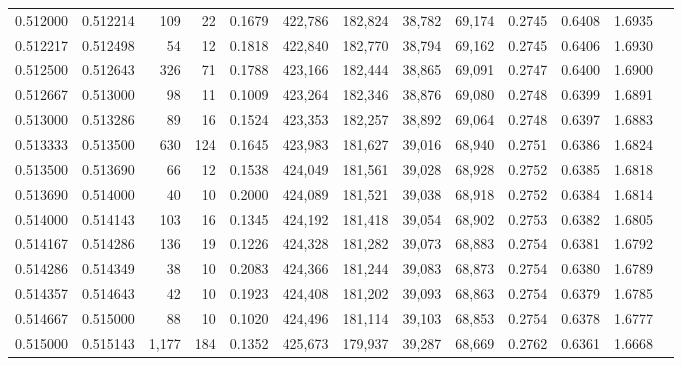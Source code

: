 \begin{tabular}{rrrrrrrrrrrrr}
0.512000 & 0.512214 &   109 &  22 &                                     0.1679 & 422,786 & 182,824 &  38,782 &  69,174 & 0.2745 & 0.6408 & 1.6935 \\
0.512217 & 0.512498 &    54 &  12 &                                     0.1818 & 422,840 & 182,770 &  38,794 &  69,162 & 0.2745 & 0.6406 & 1.6930 \\
0.512500 & 0.512643 &   326 &  71 &                                     0.1788 & 423,166 & 182,444 &  38,865 &  69,091 & 0.2747 & 0.6400 & 1.6900 \\
0.512667 & 0.513000 &    98 &  11 &                                     0.1009 & 423,264 & 182,346 &  38,876 &  69,080 & 0.2748 & 0.6399 & 1.6891 \\
0.513000 & 0.513286 &    89 &  16 &                                     0.1524 & 423,353 & 182,257 &  38,892 &  69,064 & 0.2748 & 0.6397 & 1.6883 \\
0.513333 & 0.513500 &   630 & 124 &                                     0.1645 & 423,983 & 181,627 &  39,016 &  68,940 & 0.2751 & 0.6386 & 1.6824 \\
0.513500 & 0.513690 &    66 &  12 &                                     0.1538 & 424,049 & 181,561 &  39,028 &  68,928 & 0.2752 & 0.6385 & 1.6818 \\
0.513690 & 0.514000 &    40 &  10 &                                     0.2000 & 424,089 & 181,521 &  39,038 &  68,918 & 0.2752 & 0.6384 & 1.6814 \\
0.514000 & 0.514143 &   103 &  16 &                                     0.1345 & 424,192 & 181,418 &  39,054 &  68,902 & 0.2753 & 0.6382 & 1.6805 \\
0.514167 & 0.514286 &   136 &  19 &                                     0.1226 & 424,328 & 181,282 &  39,073 &  68,883 & 0.2754 & 0.6381 & 1.6792 \\
0.514286 & 0.514349 &    38 &  10 &                                     0.2083 & 424,366 & 181,244 &  39,083 &  68,873 & 0.2754 & 0.6380 & 1.6789 \\
0.514357 & 0.514643 &    42 &  10 &                                     0.1923 & 424,408 & 181,202 &  39,093 &  68,863 & 0.2754 & 0.6379 & 1.6785 \\
0.514667 & 0.515000 &    88 &  10 &                                     0.1020 & 424,496 & 181,114 &  39,103 &  68,853 & 0.2754 & 0.6378 & 1.6777 \\
0.515000 & 0.515143 & 1,177 & 184 &                                     0.1352 & 425,673 & 179,937 &  39,287 &  68,669 & 0.2762 & 0.6361 & 1.6668 \\

\end{tabular}
